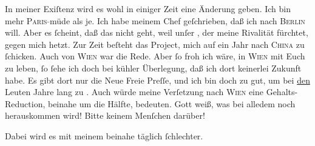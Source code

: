 \pstart
           {\pb}In meiner Exiſtenz wird es wohl in
               einiger Zeit  eine Änderung geben. Ich bin mehr \textsc{Paris}\textcolor{gray}{-}müde als je. Ich habe meinem Chef geſchrieben, daß ich nach \textsc{Berlin} will. Aber es{ }ſcheint, daß das nicht geht, weil unſer \label{K_L02835-3v}\label{K_L02835-3}, der meine
               Rivalität fürchtet, gegen mich hetzt. Zur Zeit beſteht das Project, mich auf ein Jahr
               nach \textsc{China} zu{ }ſchicken. Auch von \textsc{Wien} war die Rede. Aber{ }ſo froh ich wäre, in \textsc{Wien} mit Euch zu leben,{ }ſo{ }ſehe ich doch  bei kühler Überlegung, daß ich dort keinerlei Zukunft habe. Es gibt dort nur
               die Neue Freie Preſſe, und ich bin  doch zu gut, um bei \uline{den} Leuten Jahre lang zu \label{K_L02835-4v}\label{K_L02835-4}.
               Auch würde meine Verſetzung nach \textsc{Wien} eine Gehalts-Reduction, beinahe um die Hälfte, bedeuten. Gott weiß, was bei
               alledem noch herauskommen wird! Bitte\label{T_L02835-1v}\label{T_L02835-1} keinem Menſchen darüber!\pend
           
\pstart
           {\pb}Dabei wird es mit meinem \label{K_L02835-5v}\label{K_L02835-5} beinahe täglich{ }ſchlechter.\pend
           
